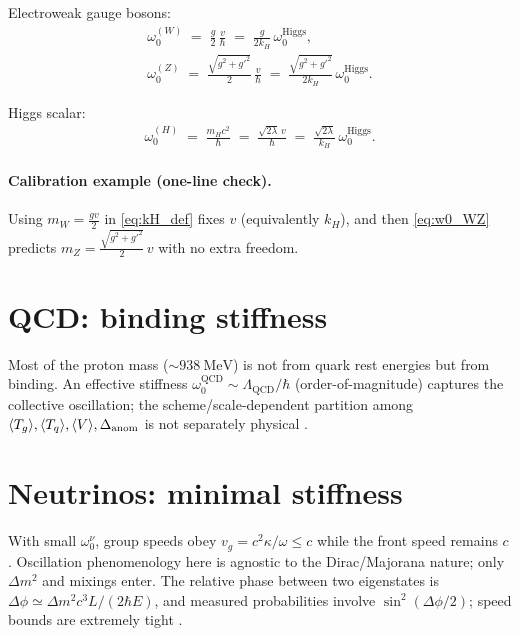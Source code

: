 \documentclass[11pt,oneside]{article}
\begin{document}
Electroweak gauge bosons:
\begin{equation}
\label{eq:w0_WZ}
\begin{aligned}
\omega_0^{(W)} \;=\; \frac{g}{2}\,\frac{v}{\hbar}
                   \;=\; \frac{g}{2k_H}\,\omega_0^{\mathrm{Higgs}},\\[4pt]
\omega_0^{(Z)} \;=\; \frac{\sqrt{g^2+g'^2}}{2}\,\frac{v}{\hbar}
                   \;=\; \frac{\sqrt{g^2+g'^2}}{2k_H}\,\omega_0^{\mathrm{Higgs}}.
\end{aligned}
\end{equation}

Higgs scalar:
\begin{equation}
\label{eq:w0_H}
\begin{aligned}
\omega_0^{(H)} \;=\; \frac{m_H c^2}{\hbar}
                   \;=\; \frac{\sqrt{2\lambda}\,v}{\hbar}
                   \;=\; \frac{\sqrt{2\lambda}}{k_H}\,\omega_0^{\mathrm{Higgs}}.
\end{aligned}
\end{equation}

\paragraph{Calibration example (one-line check).}
Using \(m_W=\tfrac{g v}{2}\) in \eqref{eq:kH_def} fixes \(v\) (equivalently \(k_H\)), and then \eqref{eq:w0_WZ} predicts \(m_Z=\tfrac{\sqrt{g^2+g'^2}}{2}\,v\) with no extra freedom.

\section{QCD: binding stiffness}
Most of the proton mass (\(\sim 938~\mathrm{MeV}\)) is not from quark rest energies but from binding. An effective stiffness \(\omega_0^{\mathrm{QCD}}\sim\Lambda_{\mathrm{QCD}}/\hbar\) (order-of-magnitude) captures the collective oscillation; the scheme/scale-dependent partition among \(\langle T_g\rangle,\langle T_q\rangle,\langle V\rangle,\Delta_{\rm anom}\) is not separately physical \cite{krane1988introductory}.

\section{Neutrinos: minimal stiffness}
With small \(\omega_0^\nu\), group speeds obey \(v_g=c^2\kappa/\omega\le c\) while the front speed remains \(c\).
Oscillation phenomenology here is agnostic to the Dirac/Majorana nature; only \(\Delta m^2\) and mixings enter.
The relative phase between two eigenstates is
\(
\Delta\phi \simeq \Delta m^2 c^3 L/(2\hbar E)
\),
and measured probabilities involve \(\sin^2(\Delta\phi/2)\); speed bounds are extremely tight \cite{griffiths2018quantum}.
\end{document}
